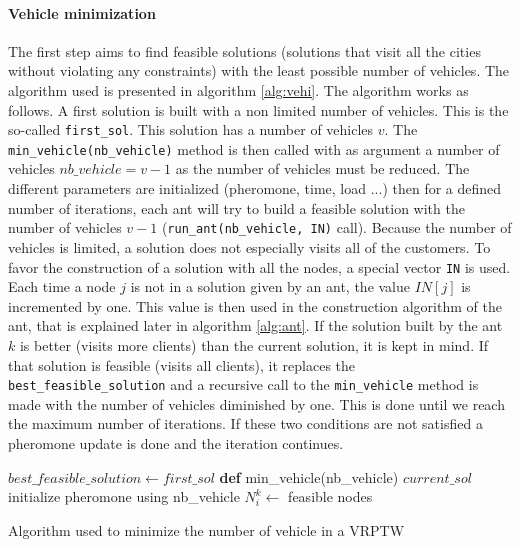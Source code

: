 \paragraph{Vehicle minimization}
The first step aims to find feasible solutions (solutions that visit all the cities without violating any constraints) with the least possible number of vehicles. The algorithm used is presented in algorithm \ref{alg:vehi}. The algorithm works as follows. A first solution is built with a non limited number of vehicles. This is the so-called \texttt{first\_sol}. This solution has a number of vehicles $v$. The \texttt{min\_vehicle(nb\_vehicle)} method is then called with as argument a number of vehicles $nb\_vehicle = v-1$ as the number of vehicles must be reduced. The different parameters are initialized (pheromone, time, load ...) then for a defined number of iterations, each ant will try to build a feasible solution with the number of vehicles $v-1$ (\texttt{run\_ant(nb\_vehicle, IN)} call). Because the number of vehicles is limited, a solution does not especially visits all of the customers. To favor the construction of a solution with all the nodes, a special vector \texttt{IN} is used. Each time a node $j$ is not in a solution given by an ant, the value $IN[j]$ is incremented by one. This value is then used in the construction algorithm of the ant, that is explained later in algorithm \ref{alg:ant}.
If the solution built by the ant $k$ is better (visits more clients) than the current solution, it is kept in mind. If that solution is feasible (visits all clients), it replaces the \texttt{best\_feasible\_solution} and a recursive call to the \texttt{min\_vehicle} method is made with the number of vehicles diminished by one. This is done until we reach the maximum number of iterations. If these two conditions are not satisfied a pheromone update is done and the iteration continues.
 
 \begin{algorithm}
		$best\_feasible\_solution \leftarrow first\_sol$\;
	 \textbf{def} min\_vehicle(nb\_vehicle)\;
		$current\_sol$\;
		initialize pheromone using nb\_vehicle\;
		$N_i^k \leftarrow$ feasible nodes \;
					
\caption{Algorithm used to minimize the number of vehicle in a VRPTW}\label{alg:vehi}
\end{algorithm}



